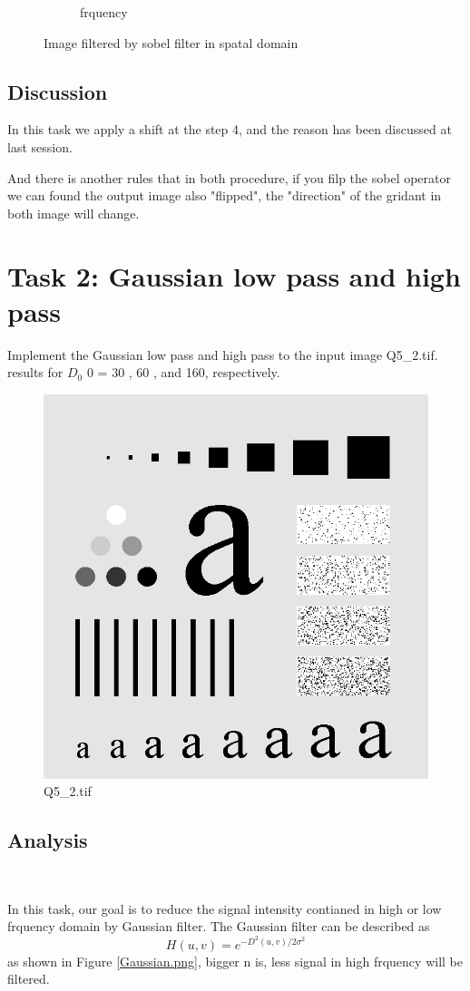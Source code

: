 \documentclass[
	12pt, %
]{style/fphw}
\begin{document}
\begin{figure}[H]
\begin{subfigure}[b]{0.45\textwidth}
         \caption{frquency}
         \label{Q5_1_frequency.png}
     \end{subfigure}
        \caption{Image filtered by sobel filter in spatal domain}
        \label{sobel filter spatal}
\end{figure}

\subsection*{Discussion}

In this task we apply a shift at the step 4, and the reason has been discussed at last session.

And there is another rules that in both procedure, if you filp the sobel operator we can found the output image also "flipped", the "direction" of the gridant in both image will change.

\newpage
\section*{Task 2: Gaussian low pass and high pass}

\begin{problem}
Implement the Gaussian low pass and high pass to the input image Q5\_2.tif. results for $D_0$ 0 = 30 , 60 , and 160, respectively.

\begin{figure}[H]
    \centering
    \includegraphics[width=0.3\linewidth]{plots/Q5_2.png}
    \caption{Q5\_2.tif}
    \label{Q5_2.tif}
\end{figure}
\end{problem}

\subsection*{Analysis} \

In this task, our goal is to reduce the signal intensity contianed in high or low frquency domain by Gaussian filter. The Gaussian filter can be described as $$H(u,v)=e^{-D^2(u,v)/2\sigma^2}$$ as shown in Figure \ref{Gaussian.png}, bigger n is, less signal in high frquency will be filtered.
\end{document}
